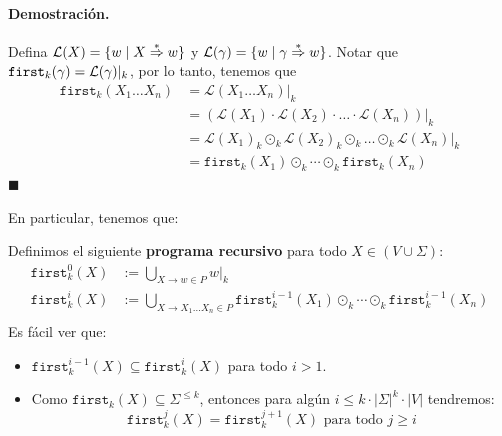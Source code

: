 \paragraph{Demostración.} Defina $\mathcal{L}(X)=\{w \mid X \overset{*}{\Rightarrow} w\}$ y $\mathcal{L}(\gamma) = \{w \mid \gamma \overset{*}{\Rightarrow} w\}$. Notar que $\texttt{first}_k(\gamma) = \mathcal{L}(\gamma)|_k$, por lo tanto, tenemos que
\begin{align*}
    \texttt{first}_k\left(X_1 \ldots X_n\right) & =\left.\mathcal{L}\left(X_1 \ldots X_n\right)\right|_k                                                                                    \\
                                                & =\left.\left(\mathcal{L}\left(X_1\right) \cdot \mathcal{L}\left(X_2\right) \cdot \ldots \cdot \mathcal{L}\left(X_n\right)\right)\right|_k \\
                                                & =\mathcal{L}\left(X_1\right)_k \odot_k \mathcal{L}\left(X_2\right)_k \odot_k \ldots \odot_k \mathcal{L}\left(X_n\right)|_k                \\
                                                & =\texttt{first}_k\left(X_1\right) \odot_k \cdots \odot_k \texttt{first}_k\left(X_n\right)
\end{align*}
\hfill $\blacksquare$ \medbreak

En particular, tenemos que:

Definimos el siguiente \textbf{programa recursivo} para todo $X \in (V \cup \Sigma)$:
\begin{align*}
    \texttt{first}_k^0(X) & :=\bigcup_{X \rightarrow w \in P} w|_k                                                                                                              \\
    \texttt{first}_k^i(X) & :=\bigcup_{X \rightarrow X_1 \ldots X_n \in P} \texttt{first}_k^{i-1}\left(X_1\right) \odot_k \cdots \odot_k \texttt{first}_k^{i-1}\left(X_n\right) \\
\end{align*}
Es fácil ver que:
\begin{itemize}
    \item $\texttt{first}_k^{i-1}(X) \subseteq \texttt{first}_k^i(X)$ para todo $i > 1$.
    \item Como $\texttt{first}_k(X) \subseteq \Sigma^{\le k}$, entonces para algún $i \le k \cdot |\Sigma|^k \cdot |V|$ tendremos:
          $$
              \texttt{first}_k^j(X)=\texttt{first}_k^{j+1}(X) \text { para todo } j \geq i
          $$
\end{itemize}

